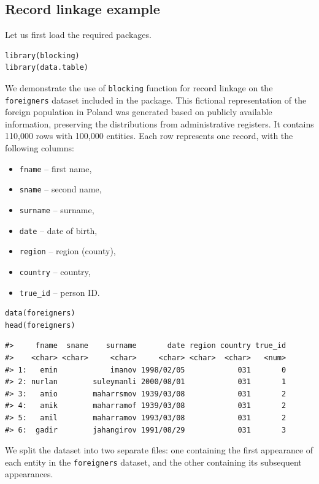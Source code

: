\subsection{Record linkage example}\label{record-linkage-example}

Let us first load the required packages.

\begin{verbatim}
library(blocking)
library(data.table)
\end{verbatim}

We demonstrate the use of \texttt{blocking} function for record linkage on the \texttt{foreigners} dataset included in the package. This fictional representation of the foreign population in Poland was generated based on publicly available information, preserving the distributions from administrative registers. It contains 110,000 rows with 100,000 entities. Each row represents one record, with the following columns:

\begin{itemize}
\tightlist
\item
  \texttt{fname} -- first name,
\item
  \texttt{sname} -- second name,
\item
  \texttt{surname} -- surname,
\item
  \texttt{date} -- date of birth,
\item
  \texttt{region} -- region (county),
\item
  \texttt{country} -- country,
\item
  \texttt{true\_id} -- person ID.
\end{itemize}

\begin{verbatim}
data(foreigners)
head(foreigners)
\end{verbatim}

\begin{verbatim}
#>     fname  sname    surname       date region country true_id
#>    <char> <char>     <char>     <char> <char>  <char>   <num>
#> 1:   emin            imanov 1998/02/05            031       0
#> 2: nurlan        suleymanli 2000/08/01            031       1
#> 3:   amio        maharrsmov 1939/03/08            031       2
#> 4:   amik        maharramof 1939/03/08            031       2
#> 5:   amil        maharramov 1993/03/08            031       2
#> 6:  gadir        jahangirov 1991/08/29            031       3
\end{verbatim}

We split the dataset into two separate files: one containing the first appearance of each entity in the \texttt{foreigners} dataset, and the other containing its subsequent appearances.

